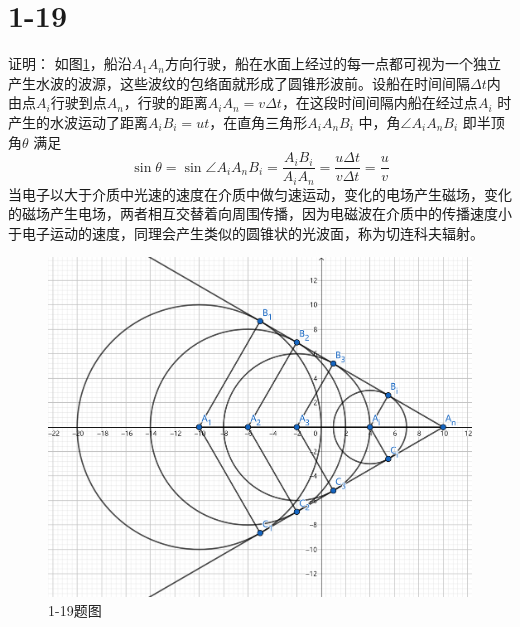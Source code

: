 \documentclass[10pt,a4paper]{article}
\theoremstyle{remark}
\begin{document}
\section*{1-19}证明：
如图\ref{FigureofProblem1-19}，船沿$A_1A_n$方向行驶，船在水面上经过的每一点都可视为一个独立产生水波的波源，这些波纹的包络面就形成了圆锥形波前。设船在时间间隔$\Delta t$内由点$A_i$行驶到点$A_n$，行驶的距离$A_iA_n = v\Delta t$，在这段时间间隔内船在经过点$A_i$ 时产生的水波运动了距离$A_iB_i = ut$，在直角三角形$A_iA_nB_i$ 中，角$\angle A_iA_nB_i$ 即半顶角$\theta$ 满足
\[
\sin\theta = \sin\angle A_iA_nB_i = \frac{A_iB_i}{A_iA_n} = \frac{u\Delta t}{v\Delta t} = \frac{u}{v}
\]
当电子以大于介质中光速的速度在介质中做匀速运动，变化的电场产生磁场，变化的磁场产生电场，两者相互交替着向周围传播，因为电磁波在介质中的传播速度小于电子运动的速度，同理会产生类似的圆锥状的光波面，称为切连科夫辐射。
\begin{figure}%
\centering
\includegraphics[scale = .15]{FigureofProblem1-19(tailored).png}
\caption{1-19题图}\label{FigureofProblem1-19}
\end{figure}
\end{document}
